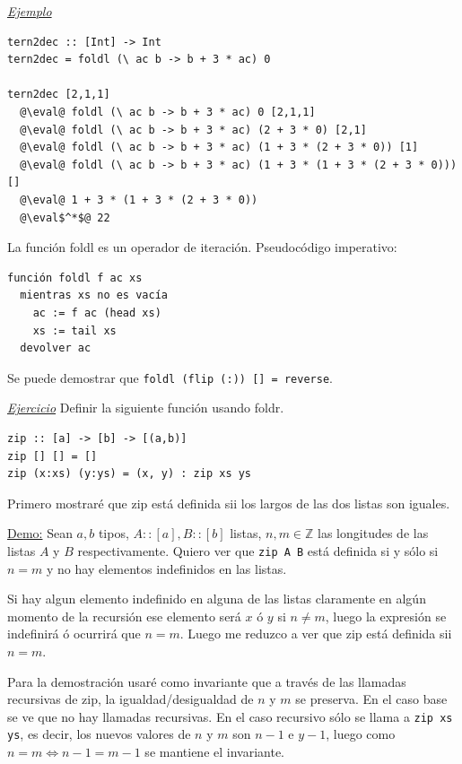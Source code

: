 \documentclass[12pt]{extarticle}
\makeatletter
\newcommand\subsubsubsection{\@startsection{paragraph}{4}{\z@}{-2.5ex\@plus -1ex \@minus -.25ex}{1.25ex \@plus .25ex}{\normalfont\normalsize\bfseries}}
\def\demostracion{\underline{Demo:} }
\def\ejemplo{\textit{\underline{Ejemplo} }}
\def\ejercicio{\textit{\underline{Ejercicio} }}
\def\eval{$\rightsquigarrow$}
\newcommand\hsline[1]{\texttt{#1}}
\makeatother
\begin{document}
\ejemplo
\begin{verbatim}
tern2dec :: [Int] -> Int
tern2dec = foldl (\ ac b -> b + 3 * ac) 0

tern2dec [2,1,1]
  @\eval@ foldl (\ ac b -> b + 3 * ac) 0 [2,1,1]
  @\eval@ foldl (\ ac b -> b + 3 * ac) (2 + 3 * 0) [2,1]
  @\eval@ foldl (\ ac b -> b + 3 * ac) (1 + 3 * (2 + 3 * 0)) [1]
  @\eval@ foldl (\ ac b -> b + 3 * ac) (1 + 3 * (1 + 3 * (2 + 3 * 0))) []
  @\eval@ 1 + 3 * (1 + 3 * (2 + 3 * 0))
  @\eval$^*$@ 22 
\end{verbatim}

La función foldl es un operador de iteración.
Pseudocódigo imperativo:

\begin{verbatim}
función foldl f ac xs
  mientras xs no es vacía
    ac := f ac (head xs)
    xs := tail xs
  devolver ac
\end{verbatim}

Se puede demostrar que \hsline{foldl (flip (:)) [] = reverse}.

\subsubsubsection{Ejercicios}

\ejercicio Definir la siguiente función usando foldr.

\begin{verbatim}
zip :: [a] -> [b] -> [(a,b)]
zip [] [] = []
zip (x:xs) (y:ys) = (x, y) : zip xs ys
\end{verbatim}

Primero mostraré que zip está definida sii los largos de las dos listas son iguales.

\demostracion Sean $a, b$ tipos, $A :: [a], B :: [b]$ listas, $n, m \in \mathbb{Z}$ las longitudes de las listas $A$ y $B$ respectivamente. Quiero ver que \hsline{zip A B} está definida si y sólo si $n = m$ y no hay elementos indefinidos en las listas.

Si hay algun elemento indefinido en alguna de las listas claramente en algún momento de la recursión ese elemento será $x$ ó $y$ si $n \neq m$, luego la expresión se indefinirá ó ocurrirá que $n = m$. Luego me reduzco a ver que zip está definida sii $n = m$.

Para la demostración usaré como invariante que a través de las llamadas recursivas de zip, la igualdad/desigualdad de $n$ y $m$ se preserva. En el caso base se ve que no hay llamadas recursivas. En el caso recursivo sólo se llama a \hsline{zip xs ys}, es decir, los nuevos valores de $n$ y $m$ son $n-1$ e $y-1$, luego como $n = m \Leftrightarrow n-1 = m-1$ se mantiene el invariante.
\end{document}
